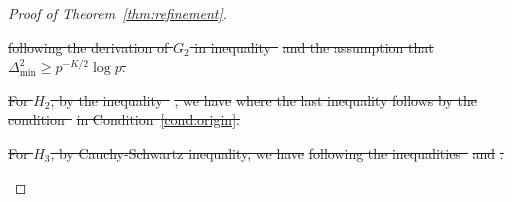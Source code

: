 \documentclass[lettersize,onecolumn,journal]{IEEEtran}
\theoremstyle{definition}
\theoremstyle{definition}
\providecommand{\DIFdeltex}[1]{{\protect\color{red}\sout{#1}}}                      %
\providecommand{\DIFdel}[1]{\texorpdfstring{\DIFdeltex{#1}}{}} %
\begin{document}
\begin{proof}[Proof of Theorem~\ref{thm:refinement}]
\begin{enumerate}
\DIFdel{following the derivation of $G_2$ in inequality~}%
\DIFdel{and the assumption that $\Delta_{\min}^2 \geq p^{-K/2} \log p$.
    }%

\DIFdel{For $H_2$, by the inequality~}%
\DIFdel{, we have 
    }%
\DIFdel{where the last inequality follows by the condition~}%
\DIFdel{in Condition~\ref{cond:origin}.
    }%


\DIFdel{For $H_3$,  by Cauchy-Schwartz inequality, we have 
    }%
\DIFdel{following the inequalities~}%
\DIFdel{and }%
\DIFdel{.
    }%


\end{enumerate}
\end{proof}
\end{document}

